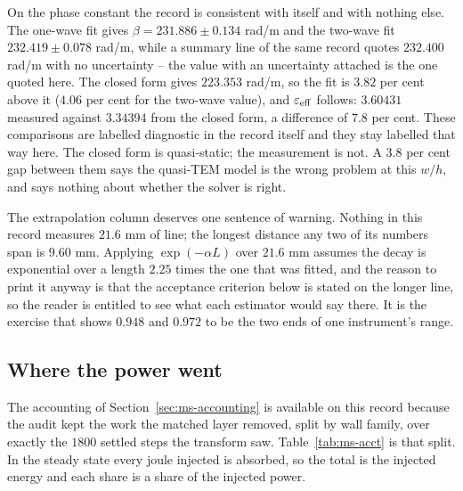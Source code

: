 On the phase constant the record is consistent with itself and with nothing else. The one-wave fit gives
$\beta = 231.886 \pm 0.134$ rad/m and the two-wave fit $232.419 \pm 0.078$ rad/m, while a summary line of the same
record quotes $232.400$ rad/m with no uncertainty -- the value with an uncertainty attached is the one quoted
here. The closed form gives $223.353$ rad/m, so the fit is $3.82$ per cent above it ($4.06$ per cent for the
two-wave value), and $\varepsilon_{\mathrm{eff}}$ follows: $3.60431$ measured against $3.34394$ from the closed form, a
difference of $7.8$ per cent. These comparisons are labelled diagnostic in the record itself and they stay
labelled that way here. The closed form is quasi-static; the measurement is not. A $3.8$ per cent gap between
them says the quasi-TEM model is the wrong problem at this $w/h$, and says nothing about whether the solver is
right.

The extrapolation column deserves one sentence of warning. Nothing in this record measures $21.6$ mm of line; the
longest distance any two of its numbers span is $9.60$ mm. Applying $\exp(-\alpha L)$ over $21.6$ mm assumes the
decay is exponential over a length $2.25$ times the one that was fitted, and the reason to print it anyway is that
the acceptance criterion below is stated on the longer line, so the reader is entitled to see what each estimator
would say there. It is the exercise that shows $0.948$ and $0.972$ to be the two ends of one instrument's range.

\subsection{Where the power went}
\label{sec:msres-accounting}

The accounting of Section~\ref{sec:ms-accounting} is available on this record because the audit kept the work the
matched layer removed, split by wall family, over exactly the $1800$ settled steps the transform saw.
Table~\ref{tab:ms-acct} is that split. In the steady state every joule injected is absorbed, so the total is the
injected energy and each share is a share of the injected power.

